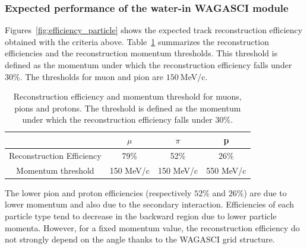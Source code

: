 \subsubsection{Expected performance of the water-in WAGASCI module}
\label{sec:mc_waterin}
Figures~\ref{fig:efficiency_particle} shows the expected track reconstruction efficiency obtained with the criteria above.
Table~\ref{tab:reconstructedparticles} summarizes the reconstruction efficiencies and the reconstruction momentum thresholds.
This threshold is defined as the momentum under which the reconstruction efficiency falls under $30\%$.
The thresholds for muon and pion are $150~$MeV/c. %
\begin{table}[htbp]
  \begin{center}
    \caption{\label{tab:reconstructedparticles} Reconstruction efficiency and momentum threshold for muons, pions and protons.
The threshold is defined as the momentum under which the reconstruction efficiency falls under $30\%$.}
    \begin{tabular}{c|ccc}
      \hline
      & $\mu$ & $\pi$ & p \\
      \hline
      Reconstruction Efficiency & 79\% & 52\% & 26\% \\\hline
      Momentum threshold & 150 MeV/c & 150 MeV/c & 550 MeV/c \\
      \hline
    \end{tabular}
  \end{center}
\end{table}
The lower pion and proton efficiencies (respectively $52\%$ and $26\%$) are due to lower momentum and also due to the secondary interaction.
Efficiencies of each particle type tend to decrease in the backward region due to lower particle momenta.
However, for a fixed momentum value, the reconstruction efficiency do not strongly depend on the angle thanks to the WAGASCI grid structure. 
